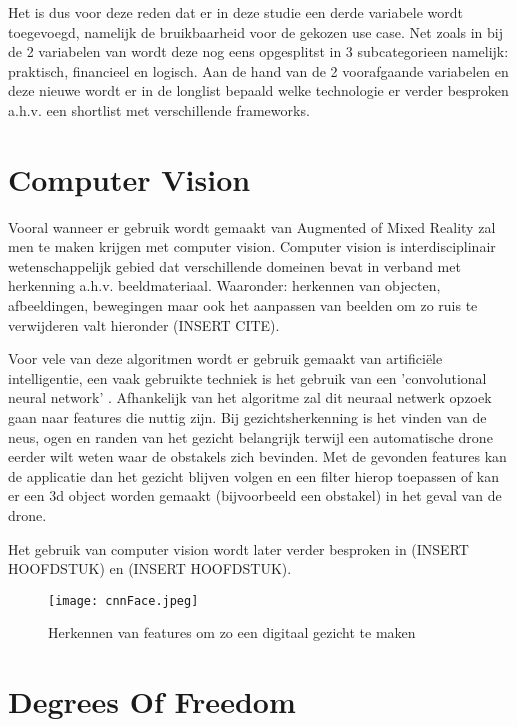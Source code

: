 Het is dus voor deze reden dat er in deze studie een derde variabele wordt toegevoegd, namelijk de bruikbaarheid voor de gekozen use case. Net zoals in bij de 2 variabelen van \textcite{Steuer1992} wordt deze nog eens opgesplitst in 3 subcategorieen namelijk: praktisch, financieel en logisch. Aan de hand van de 2 voorafgaande variabelen en deze nieuwe wordt er in de longlist bepaald welke technologie er verder besproken a.h.v. een shortlist met verschillende frameworks. 

\section{Computer Vision}

Vooral wanneer er gebruik wordt gemaakt van Augmented of Mixed Reality zal men te maken krijgen met computer vision. Computer vision is interdisciplinair wetenschappelijk gebied dat verschillende domeinen bevat in verband met herkenning a.h.v. beeldmateriaal. Waaronder: herkennen van objecten, afbeeldingen, bewegingen maar ook het aanpassen van beelden om zo ruis te verwijderen valt hieronder (INSERT CITE).

Voor vele van deze algoritmen wordt er gebruik gemaakt van artificiële intelligentie, een vaak gebruikte techniek is het gebruik van een 'convolutional neural network' \autocite{Ji2010}. Afhankelijk van het algoritme zal dit neuraal netwerk opzoek gaan naar features die nuttig zijn. Bij gezichtsherkenning is het vinden van de neus, ogen en randen van het gezicht belangrijk terwijl een automatische drone eerder wilt weten waar de obstakels zich bevinden. Met de gevonden features kan de applicatie dan het gezicht blijven volgen en een filter hierop toepassen of kan er een 3d object worden gemaakt (bijvoorbeeld een obstakel) in het geval van de drone. 

Het gebruik van computer vision wordt later verder besproken in (INSERT HOOFDSTUK) en (INSERT HOOFDSTUK). %
\begin{figure}
    \texttt{[image: cnnFace.jpeg]}
    \caption{Herkennen van features om zo een digitaal gezicht te maken}
    \label{fig:cnnface}
\end{figure}

\section{Degrees Of Freedom}

